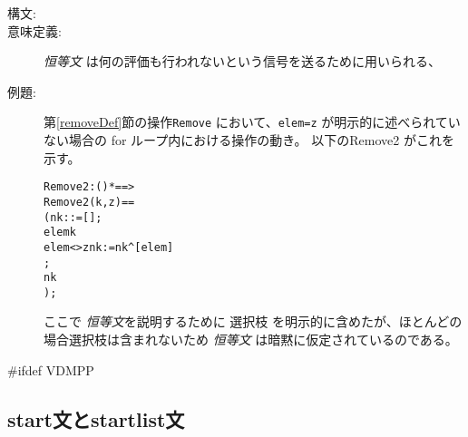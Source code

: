 \documentclass[\pformat,12pt]{jarticle}
\begin{document}
\begin{description}
\item[構文:]


\item[意味定義:]  {\it 恒等文\/} は何の評価も行われないという信号を送るために用いられる、

\item[例題:] 第\ref{removeDef}節の操作\texttt{Remove} において、\texttt{elem=z} が明示的に述べられていない場合の \textsf{for} ループ内における操作の動き。
以下の{Remove2} がこれを示す。
  \begin{alltt}
  Remove2 : () *  ==> 
  Remove2 (k,z) ==
    ( nk :  := [];
      elem  k 
        elem <> z  nk := nk^[elem]
       ;
      nk
    );
  \end{alltt}
ここで {\it 恒等文}を説明するために 選択枝 を明示的に含めたが、ほとんどの場合選択枝は含まれないため {\it 恒等文\/} は暗黙に仮定されているのである。

\end{description}

#ifdef VDMPP
\subsection{start文とstartlist文}\label{sec:start}
\label{sc:startstmt}
\end{document}
